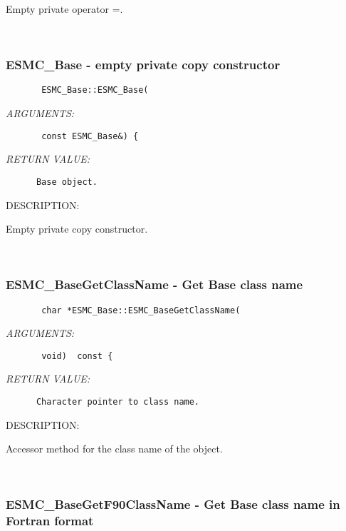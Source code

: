       Empty private operator =.
   
 
\mbox{}\hrulefill\
 
\subsubsection [ESMC\_Base] {ESMC\_Base - empty private copy constructor}


  
\begin{verbatim}       ESMC_Base::ESMC_Base(\end{verbatim}{\em ARGUMENTS:}
\begin{verbatim}       const ESMC_Base&) {\end{verbatim}{\em RETURN VALUE:}
\begin{verbatim}      Base object.\end{verbatim}
{\sf DESCRIPTION:\\ }


      Empty private copy constructor.
   
 
\mbox{}\hrulefill\
 
\subsubsection [ESMC\_BaseGetClassName] {ESMC\_BaseGetClassName - Get Base class name}


  
\begin{verbatim}       char *ESMC_Base::ESMC_BaseGetClassName(\end{verbatim}{\em ARGUMENTS:}
\begin{verbatim}       void)  const {\end{verbatim}{\em RETURN VALUE:}
\begin{verbatim}      Character pointer to class name.\end{verbatim}
{\sf DESCRIPTION:\\ }


      Accessor method for the class name of the object.
   
 
\mbox{}\hrulefill\
 
\subsubsection [ESMC\_BaseGetF90ClassName] {ESMC\_BaseGetF90ClassName - Get Base class name in Fortran format}


